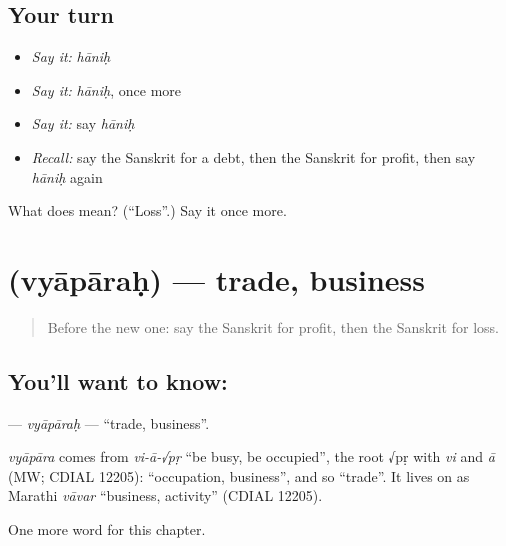 \subsection*{Your turn}
\begin{itemize}
\raggedright
  \item \emph{Say it:} \emph{hāniḥ}
  \item \emph{Say it:} \emph{hāniḥ}, once more
  \item \emph{Say it:} say \emph{hāniḥ}
  \item \emph{Recall:} say the Sanskrit for a debt, then the Sanskrit for profit, then say \emph{hāniḥ} again
\end{itemize}

\begin{tcolorbox}[breakable,colback=teal!4,colframe=teal!35!black,title={Before you move on}]
What does  mean? (\textquotedblleft{}Loss\textquotedblright{}.) Say it once more.
\end{tcolorbox}
\section[\texorpdfstring{\sk{व्यापारः} (vyāpāraḥ)}{व्यापारः (vyāpāraḥ)}]{ (vyāpāraḥ) — trade, business}

\label{lesson:SA-C162-vyaparah}



\begin{quote}
Before the new one: say the Sanskrit for profit, then the Sanskrit for loss.
\end{quote}

\subsection*{You'll want to know: }
\textbf{} — \emph{vyāpāraḥ} — \textquotedblleft{}trade, business\textquotedblright{}.

\begin{cousinweb}
\emph{vyāpāra} comes from \emph{vi-ā-√pṛ} \textquotedblleft{}be busy, be occupied\textquotedblright{}, the root √pṛ with \emph{vi} and \emph{ā} (MW; CDIAL 12205): \textquotedblleft{}occupation, business\textquotedblright{}, and so \textquotedblleft{}trade\textquotedblright{}. It lives on as Marathi \emph{vāvar} \textquotedblleft{}business, activity\textquotedblright{} (CDIAL 12205).
\end{cousinweb}

\begin{grammarlens}[title={What you've built}]
One more word for this chapter.
\end{grammarlens}

